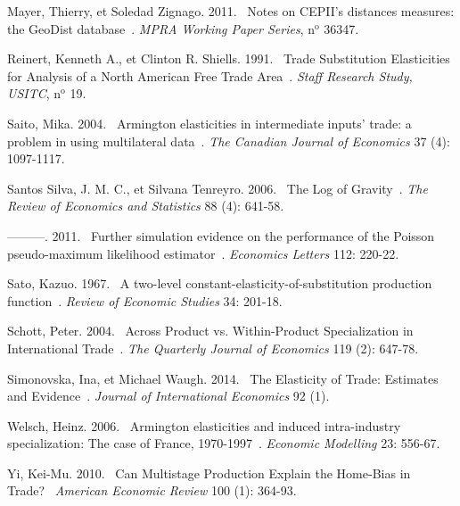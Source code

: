 \documentclass[12pt,twoside,a4paper,notitlepage]{article}
\begin{document}
Mayer, Thierry, et Soledad Zignago. 2011. {\flqq}~Notes on CEPII's distances measures: the GeoDist database~{\frqq}. \textit{MPRA Working Paper Series}, n$^{\mathrm{o}}$ 36347.

Reinert, Kenneth A., et Clinton R. Shiells. 1991. {\flqq}~Trade Substitution Elasticities for Analysis of a North American Free Trade Area~{\frqq}. \textit{Staff Research Study, USITC}, n$^{\mathrm{o}}$ 19.

Saito, Mika. 2004. {\flqq}~Armington elasticities in intermediate inputs' trade: a problem in using multilateral data~{\frqq}. \textit{The Canadian Journal of Economics} 37 (4): 1097\hbox{-}1117.

Santos Silva, J. M. C., et Silvana Tenreyro. 2006. {\flqq}~The Log of Gravity~{\frqq}. \textit{The Review of Economics and Statistics} 88 (4): 641\hbox{-}58.

---------. 2011. {\flqq}~Further simulation evidence on the performance of the Poisson pseudo-maximum likelihood estimator~{\frqq}. \textit{Economics Letters} 112: 220\hbox{-}22.

Sato, Kazuo. 1967. {\flqq}~A two-level constant-elasticity-of-substitution production function~{\frqq}. \textit{Review of Economic Studies} 34: 201\hbox{-}18.

Schott, Peter. 2004. {\flqq}~Across Product vs. Within-Product Specialization in International Trade~{\frqq}. \textit{The Quarterly Journal of Economics} 119 (2): 647\hbox{-}78.

Simonovska, Ina, et Michael Waugh. 2014. {\flqq}~The Elasticity of Trade: Estimates and Evidence~{\frqq}. \textit{Journal of International Economics} 92 (1).

Welsch, Heinz. 2006. {\flqq}~Armington elasticities and induced intra-industry specialization: The case of France, 1970-1997~{\frqq}. \textit{Economic Modelling} 23: 556\hbox{-}67.

Yi, Kei-Mu. 2010. {\flqq}~Can Multistage Production Explain the Home-Bias in Trade?~{\frqq} \textit{American Economic Review} 100 (1): 364\hbox{-}93.
\end{document}
